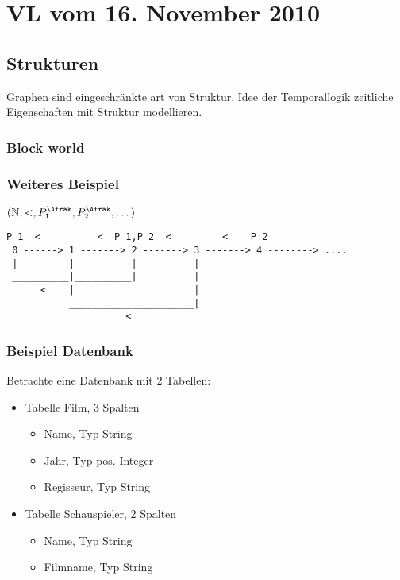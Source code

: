 \section{VL vom 16. November 2010}

\subsection{Strukturen}
Graphen sind eingeschränkte art von Struktur.
Idee der Temporallogik zeitliche Eigenschaften mit Struktur modellieren.
\subsubsection{Block world}

\begin{center}
\end{center}

\subsubsection{Weiteres Beispiel}
$(\mathbb{N}, <, P_1^{\Afrak}, P_2^{\Afrak}, \dots)$
\begin{verbatim}
P_1  <          <  P_1,P_2  <         <    P_2
 0 ------> 1 -------> 2 -------> 3 -------> 4 --------> ....
 |         |          |          |
 __________|__________|          |
      <    |                     |
           ______________________|
                     <
\end{verbatim}

\subsubsection{Beispiel Datenbank}
Betrachte eine Datenbank mit 2 Tabellen:
\begin{itemize}
\item Tabelle Film, 3 Spalten
\begin{itemize}
\item Name, Typ String
\item Jahr, Typ pos. Integer
\item Regisseur, Typ String
\end{itemize}
\item Tabelle Schauspieler, 2 Spalten
\begin{itemize}
\item Name, Typ String
\item Filmname, Typ String
\end{itemize}
\end{itemize}

